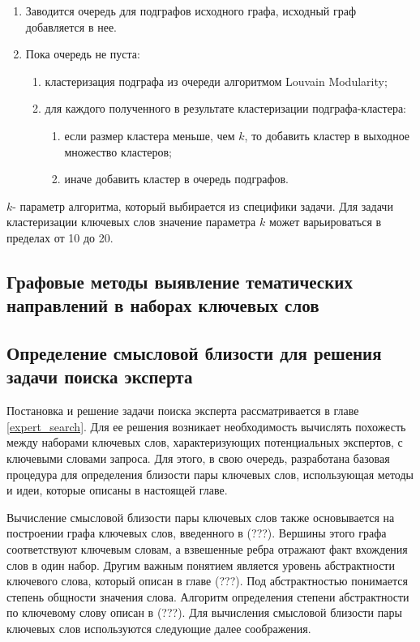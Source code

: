 \begin{enumerate}
    \item Заводится очередь для подграфов исходного графа, исходный граф добавляется в нее.
    \item Пока очередь не пуста:
    \begin{enumerate}
        \item кластеризация подграфа из очереди алгоритмом Louvain Modularity;
        \item для каждого полученного в результате кластеризации подграфа-кластера:
            \begin{enumerate}
                \item если размер кластера меньше, чем $k$, то добавить кластер в выходное множество кластеров;
                \item иначе добавить кластер в очередь подграфов.
            \end{enumerate}
    \end{enumerate}
\end{enumerate}

$k$- параметр алгоритма, который выбирается из специфики задачи. Для задачи кластеризации ключевых слов значение параметра $k$ может варьироваться в пределах от 10 до 20.

\subsection{Графовые методы выявление тематических направлений в наборах ключевых слов} %
\subsection{Определение смысловой близости для решения задачи поиска эксперта} \label{expert_search_wordsim}
Постановка и решение задачи поиска эксперта рассматривается в главе \ref{expert_search}. Для ее решения возникает необходимость вычислять похожесть между наборами ключевых слов, характеризующих потенциальных экспертов, с ключевыми словами запроса. Для этого, в свою очередь, разработана базовая процедура для определения близости пары ключевых слов, использующая методы и идеи, которые описаны в настоящей главе.

Вычисление смысловой близости пары ключевых слов также основывается на построении графа ключевых слов, введенного в (???). Вершины этого графа соответствуют ключевым словам, а взвешенные ребра отражают факт вхождения слов в один набор. Другим важным понятием является уровень абстрактности ключевого слова, который описан в главе (???). Под абстрактностью понимается степень общности значения слова. Алгоритм определения степени абстрактности по ключевому слову описан в (???). Для вычисления смысловой близости пары ключевых слов используются следующие далее соображения.

